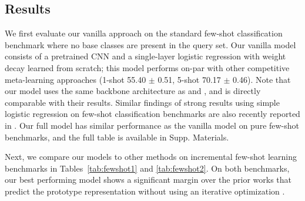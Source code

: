 \subsection{Results}
We first evaluate our vanilla approach on the standard few-shot classification benchmark where no
base classes are present in the query set. Our vanilla model consists of a pretrained CNN and a
single-layer logistic regression with weight decay learned from scratch; this model performs on-par
with other competitive meta-learning approaches (1-shot 55.40 $\pm$ 0.51, 5-shot 70.17 $\pm$ 0.46).
Note that our model uses the same backbone architecture as \citep{mishra2017meta} and \citep{lwof},
and is directly comparable with their results. Similar findings of strong results using simple
logistic regression on few-shot classification benchmarks are also recently reported in
\citep{closerlook}. Our full model has similar performance as the vanilla model on pure few-shot
benchmarks, and the full table is available in Supp. Materials.

Next, we compare our models to other methods on incremental few-shot learning benchmarks in
Tables~\ref{tab:fewshot1} and  \ref{tab:fewshot2}. On both benchmarks, our best performing model
shows a significant margin over the prior works that predict the prototype representation without
using an iterative optimization \citep{proto,qi2018imprinting,lwof}.



